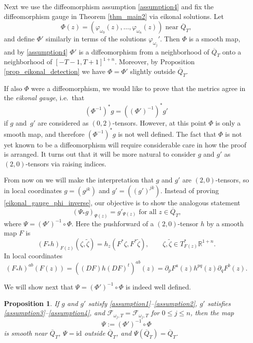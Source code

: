 \documentclass[11pt,letterpaper]{amsart}
\newtheorem{Proposition}[Theorem]{Proposition}
\theoremstyle{definition}
\newtheorem{Remark}[Theorem]{Remark}
\numberwithin{equation}{section}
\newcommand{\mR}{\mathbb{R}}                    %
\newcommand{\ol}[1]{\overline{#1}}
\newcommand{\id}{\mathrm{id}}
\newcommand{\p}{\partial}
\def\p{\partial}
\begin{document}
Next we use the diffeomorphism assumption \eqref{assumption4} and fix the diffeomorphism gauge in Theorem \ref{thm_main2} via eikonal solutions. Let 
\[
\Phi(z) = (\varphi_{\omega_0}(z), \ldots, \varphi_{\omega_n}(z)) \text{ near $\ol{Q}_T$},
\]
and define $\Phi'$ similarly in terms of the solutions $\varphi_{\omega_j}'$. Then $\Phi$ is a smooth map, and by \eqref{assumption4} $\Phi'$ is a diffeomorphism from a neighborhood of $\ol{Q}_T$ onto a neighborhood of $[-T-1,T+1]^{1+n}$. Moreover, by Proposition \ref{prop_eikonal_detection} we have $\Phi = \Phi'$ slightly outside $\ol{Q}_T$. 

If also $\Phi$ were a diffeomorphism, we would like to prove that the metrics agree in the \emph{eikonal gauge}, i.e.\ that 
\begin{equation} \label{eikonal_gauge_phi_inverse}
(\Phi^{-1})^* g = ((\Phi')^{-1})^* g'
\end{equation}
if $g$ and $g'$ are considered as $(0,2)$-tensors. However, at this point $\Phi$ is only a smooth map, and therefore $(\Phi^{-1})^* g$ is not well defined. The fact that $\Phi$ is not yet known to be a diffeomorphism will require considerable care in how the proof is arranged. It turns out that it will be more natural to consider $g$ and $g'$ as $(2,0)$-tensors via raising indices.

From now on we will make the interpretation that $g$ and $g'$ are $(2,0)$-tensors, so in local coordinates $g = (g^{jk})$ and $g' = ((g')^{jk})$. Instead of proving \eqref{eikonal_gauge_phi_inverse}, our objective is to show the analogous statement 
\begin{equation*} %
(\Psi_* g)_{\Psi(z)} = g'_{\Psi(z)} \text{ for all $z \in \ol{Q}_T$,}
\end{equation*}
where $\Psi = (\Phi')^{-1} \circ \Phi$. 
Here the pushforward of a $(2,0)$-tensor $h$ by a smooth map $F$ is 
\[
(F_* h)_{F(z)}(\zeta, \tilde{\zeta}) = h_z(F^* \zeta, F^* \tilde{\zeta}), \qquad \zeta, \tilde{\zeta} \in T_{F(z)}^* \mR^{1+n}.
\]
In local coordinates 
\[
(F_* h)^{ab}(F(z)) = ((DF) h (DF)^t)^{ab}(z) = \p_p F^a (z) h^{pq}(z) \p_q F^b(z).
\]

We will show next that $\Psi = (\Phi')^{-1} \circ \Phi$ is indeed well defined.


\begin{Proposition} \label{prop_psi_well_defined}
If $g$ and $g'$ satisfy \eqref{assumption1}--\eqref{assumption2}, $g'$ satisfies \eqref{assumption3}--\eqref{assumption4}, and $\mathcal{F}_{\omega_j,T} = \mathcal{F}_{\omega_j,T}$ for $0 \leq j \leq n$, then the map 
\[
\Psi := (\Phi')^{-1} \circ \Phi
\]
is smooth near $\ol{Q}_T$, $\Psi = \id$ outside $\ol{Q}_T$, and $\Psi(\ol{Q}_T) = \ol{Q}_T$.
\end{Proposition}
\end{document}
